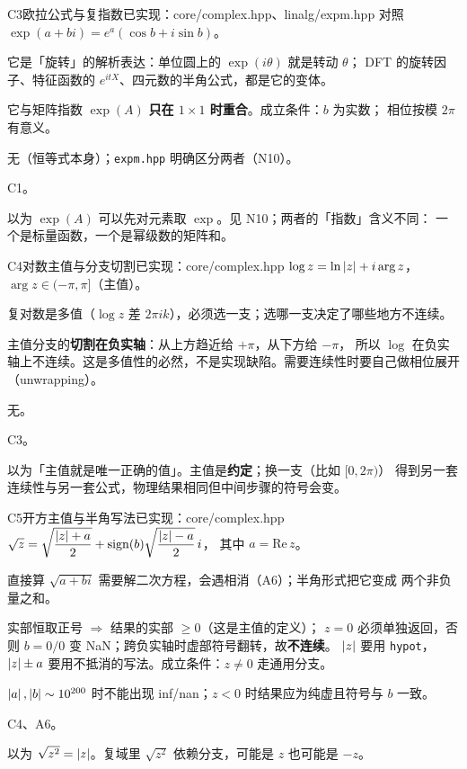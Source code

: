 \begin{know}{C3}{欧拉公式与复指数}{已实现：core/complex.hpp、linalg/expm.hpp 对照}
 $\exp(a+bi)=e^{a}(\cos b+i\sin b)$。

 它是「旋转」的解析表达：单位圆上的 $\exp(i\theta)$ 就是转动 $\theta$；
DFT 的旋转因子、特征函数的 $e^{itX}$、四元数的半角公式，都是它的变体。

 它与矩阵指数 $\exp(A)$ \textbf{只在 $1\times1$ 时重合}。成立条件：$b$ 为实数；
相位按模 $2\pi$ 有意义。

 无（恒等式本身）；\texttt{expm.hpp} 明确区分两者（N10）。

 C1。

 以为 $\exp(A)$ 可以先对元素取 $\exp$。见 N10；两者的「指数」含义不同：
一个是标量函数，一个是幂级数的矩阵和。
\end{know}

\begin{know}{C4}{对数主值与分支切割}{已实现：core/complex.hpp}
 $\log z=\ln\left\lvert z\right\rvert+i\arg z$，$\arg z\in(-\pi,\pi]$（主值）。

 复对数是多值（$\log z$ 差 $2\pi ik$），必须选一支；选哪一支决定了哪些地方不连续。

 主值分支的\textbf{切割在负实轴}：从上方趋近给 $+\pi$，从下方给 $-\pi$，
所以 $\log$ 在负实轴上不连续。这是多值性的必然，不是实现缺陷。需要连续性时要自己做相位展开（unwrapping）。

 无。

 C3。

 以为「主值就是唯一正确的值」。主值是\textbf{约定}；换一支（比如 $[0,2\pi)$）
得到另一套连续性与另一套公式，物理结果相同但中间步骤的符号会变。
\end{know}

\begin{know}{C5}{开方主值与半角写法}{已实现：core/complex.hpp}
 $\sqrt{z}=\sqrt{\dfrac{\left\lvert z\right\rvert+a}{2}}+\mathrm{sign}(b)\sqrt{\dfrac{\left\lvert z\right\rvert-a}{2}}\,i$，
其中 $a=\mathrm{Re}\,z$。

 直接算 $\sqrt{a+bi}$ 需要解二次方程，会遇相消（A6）；半角形式把它变成
两个非负量之和。

 实部恒取正号 $\Rightarrow$ 结果的实部 $\ge0$（这是主值的定义）；
$z=0$ 必须单独返回，否则 $b=0/0$ 变 NaN；跨负实轴时虚部符号翻转，故\textbf{不连续}。
$\left\lvert z\right\rvert$ 要用 \texttt{hypot}，$\left\lvert z\right\rvert\pm a$ 要用不抵消的写法。成立条件：$z\ne0$ 走通用分支。

 $\left\lvert a\right\rvert,\left\lvert b\right\rvert\sim10^{200}$ 时不能出现 inf/nan；$z<0$ 时结果应为纯虚且符号与 $b$ 一致。

 C4、A6。

 以为 $\sqrt{z^{2}}=\left\lvert z\right\rvert$。复域里 $\sqrt{z^{2}}$ 依赖分支，可能是 $z$ 也可能是 $-z$。
\end{know}

